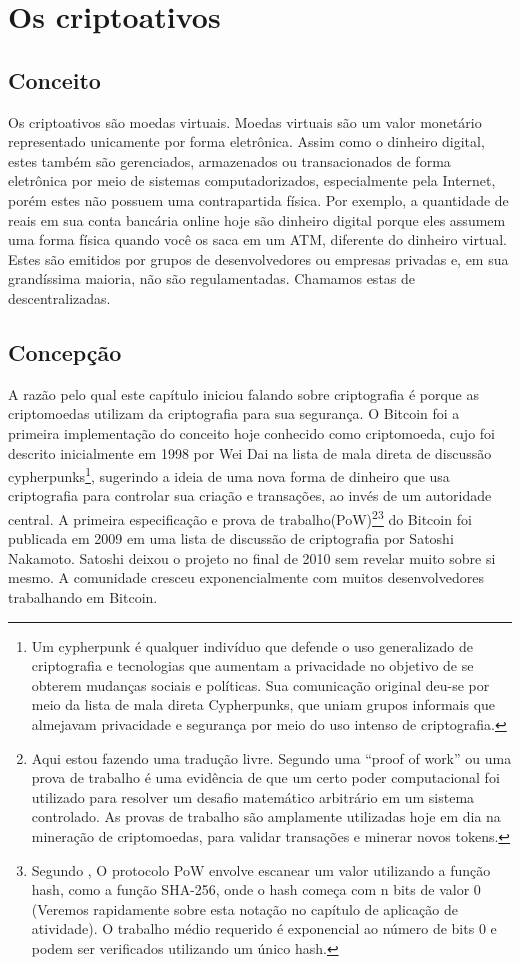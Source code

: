 \section{Os criptoativos}

\subsection{Conceito}
Os criptoativos são moedas virtuais. Moedas virtuais são um valor monetário representado unicamente por forma eletrônica. Assim como o dinheiro digital, estes também são gerenciados, armazenados ou transacionados de forma eletrônica por meio de sistemas computadorizados, especialmente pela Internet, porém estes não possuem uma contrapartida física. Por exemplo, a quantidade de reais em sua conta bancária online hoje são dinheiro digital porque eles assumem uma forma física quando você os saca em um ATM, diferente do dinheiro virtual. Estes são emitidos por grupos de desenvolvedores ou empresas privadas e, em sua grandíssima maioria, não são regulamentadas. Chamamos estas de descentralizadas.	
 
 \subsection{Concepção}
  A razão pelo qual este capítulo iniciou falando sobre criptografia é porque as criptomoedas utilizam da criptografia para sua segurança.
 O Bitcoin foi a primeira implementação do conceito hoje conhecido como criptomoeda, cujo foi descrito inicialmente em 1998 por Wei Dai na lista de mala direta de discussão cypherpunks\footnote{Um cypherpunk é qualquer indivíduo que defende o uso generalizado de criptografia  e tecnologias que aumentam a privacidade no objetivo de se obterem mudanças sociais e políticas. Sua comunicação original deu-se por meio da lista de mala direta Cypherpunks, que uniam grupos informais que almejavam privacidade e segurança por meio do uso intenso de criptografia.}, sugerindo a ideia de uma nova forma de dinheiro que usa criptografia para controlar sua criação e transações, ao invés de um autoridade central. A primeira especificação e prova de  trabalho(PoW)\footnote{Aqui estou fazendo uma tradução livre. Segundo \cite{INVPD1} uma ``proof of work'' ou uma prova de trabalho é uma evidência de que um certo poder computacional foi utilizado para resolver um desafio matemático arbitrário em um sistema controlado. As provas de trabalho são amplamente utilizadas hoje em dia na mineração de criptomoedas, para validar transações e minerar novos tokens.}\footnote{Segundo \cite{NAKAMOTO} , O protocolo PoW envolve escanear um valor utilizando a função hash, como a função SHA-256, onde o hash começa com n bits de valor 0 (Veremos rapidamente sobre esta notação no capítulo de aplicação de atividade). O trabalho médio requerido é exponencial ao número de bits 0 e podem ser verificados utilizando um único hash.} do Bitcoin foi publicada em 2009 em uma lista de discussão de criptografia por Satoshi Nakamoto. Satoshi deixou o projeto no final de 2010 sem revelar muito sobre si mesmo. A comunidade cresceu exponencialmente com muitos desenvolvedores trabalhando em Bitcoin. \cite{BTCPROJ}

